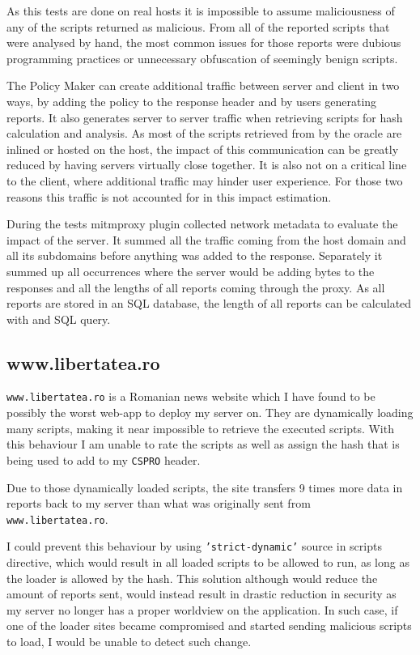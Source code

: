 As this tests are done on real hosts it is impossible to assume maliciousness of any of the scripts returned as malicious.
From all of the reported scripts that were analysed by hand, the most common issues for those reports were dubious programming practices or unnecessary obfuscation of seemingly benign scripts.

The Policy Maker can create additional traffic between server and client in two ways, by adding the policy to the response header and by users generating reports.
It also generates server to server traffic when retrieving scripts for hash calculation and analysis.
As most of the scripts retrieved from by the oracle are inlined or hosted on the host, the impact of this communication can be greatly reduced by having servers virtually close together.
It is also not on a critical line to the client, where additional traffic may hinder user experience.
For those two reasons this traffic is not accounted for in this impact estimation.

During the tests mitmproxy plugin collected network metadata to evaluate the impact of the server.
It summed all the traffic coming from the host domain and all its subdomains before anything was added to the response.
Separately it summed up all occurrences where the server would be adding bytes to the responses and all the lengths of all reports coming through the proxy.
As all reports are stored in an SQL database, the length of all reports can be calculated with and SQL query.

\subsection{www.libertatea.ro}

\texttt{www.libertatea.ro} is a Romanian news website which I have found to be possibly the worst web-app to deploy my server on.
They are dynamically loading many scripts, making it near impossible to retrieve the executed scripts.
With this behaviour I am unable to rate the scripts as well as assign the hash that is being used to add to my \texttt{CSPRO} header.

Due to those dynamically loaded scripts, the site transfers 9 times more data in reports back to my server than what was originally sent from \texttt{www.libertatea.ro}.

I could prevent this behaviour by using \texttt{'strict-dynamic'} source in scripts directive, which would result in all loaded scripts to be allowed to run, as long as the loader is allowed by the hash.
This solution although would reduce the amount of reports sent, would instead result in drastic reduction in security as my server no longer has a proper worldview on the application.
In such case, if one of the loader sites became compromised and started sending malicious scripts to load, I would be unable to detect such change.

